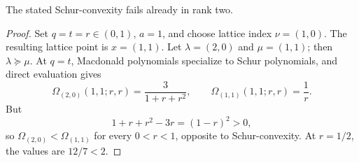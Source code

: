 \begin{theorem}\label{thm:macdonald}
The stated Schur-convexity fails already in rank two.
\end{theorem}
\begin{proof}
Set $q=t=r\in(0,1)$, $a=1$, and choose lattice index $\nu=(1,0)$.  The resulting lattice point is $x=(1,1)$.  Let $\lambda=(2,0)$ and $\mu=(1,1)$; then $\lambda\succeq\mu$.  At $q=t$, Macdonald polynomials specialize to Schur polynomials, and direct evaluation gives
\[
\Omega_{(2,0)}(1,1;r,r)=\frac{3}{1+r+r^2},\qquad
\Omega_{(1,1)}(1,1;r,r)=\frac1r.
\]
But
\[
1+r+r^2-3r=(1-r)^2>0,
\]
so $\Omega_{(2,0)}<\Omega_{(1,1)}$ for every $0<r<1$, opposite to Schur-convexity.  At $r=1/2$, the values are $12/7<2$.
\end{proof}
